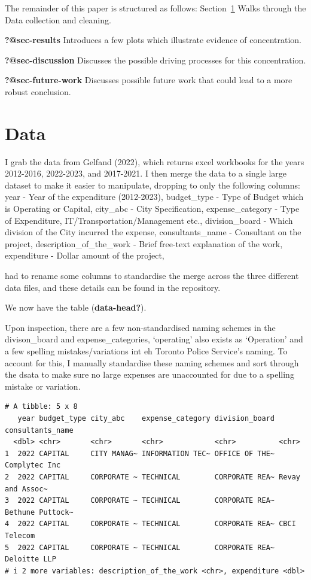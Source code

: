 \documentclass[
  letterpaper,
  DIV=11,
  numbers=noendperiod]{scrartcl}
\begin{document}
The remainder of this paper is structured as follows:
Section~\ref{sec-data} Walks through the Data collection and cleaning.

\textbf{?@sec-results} Introduces a few plots which illustrate evidence
of concentration.

\textbf{?@sec-discussion} Discusses the possible driving processes for
this concentration.

\textbf{?@sec-future-work} Discusses possible future work that could
lead to a more robust conclusion.

\section{Data}\label{sec-data}

I grab the data from Gelfand (2022), which returns excel workbooks for
the years 2012-2016, 2022-2023, and 2017-2021. I then merge the data to
a single large dataset to make it easier to manipulate, dropping to only
the following columns: year - Year of the expenditure (2012-2023), \n
budget\_type - Type of Budget which is Operating or Capital, \n
city\_abc - City Specification, \n expense\_category - Type of
Expenditure, IT/Transportation/Management etc., \n division\_board -
Which division of the City incurred the expense, \n consultants\_name -
Consultant on the project, \n description\_of\_the\_work - Brief
free-text explanation of the work, \n expenditure - Dollar amount of the
project, \n

had to rename some columns to standardise the merge across the three
different data files, and these details can be found in the repository.

We now have the table (\textbf{data-head?}).

Upon inspection, there are a few non-standardised naming schemes in the
divison\_board and expense\_categories, `operating' also exists as
`Operation' and a few spelling mistakes/variations int eh Toronto Police
Service's naming. To account for this, I manually standardise these
naming schemes and sort through the dsata to make sure no large expenses
are unaccounted for due to a spelling mistake or variation.

\begin{verbatim}
# A tibble: 5 x 8
   year budget_type city_abc    expense_category division_board consultants_name
  <dbl> <chr>       <chr>       <chr>            <chr>          <chr>           
1  2022 CAPITAL     CITY MANAG~ INFORMATION TEC~ OFFICE OF THE~ Complytec Inc   
2  2022 CAPITAL     CORPORATE ~ TECHNICAL        CORPORATE REA~ Revay and Assoc~
3  2022 CAPITAL     CORPORATE ~ TECHNICAL        CORPORATE REA~ Bethune Puttock~
4  2022 CAPITAL     CORPORATE ~ TECHNICAL        CORPORATE REA~ CBCI Telecom    
5  2022 CAPITAL     CORPORATE ~ TECHNICAL        CORPORATE REA~ Deloitte LLP    
# i 2 more variables: description_of_the_work <chr>, expenditure <dbl>
\end{verbatim}
\end{document}
